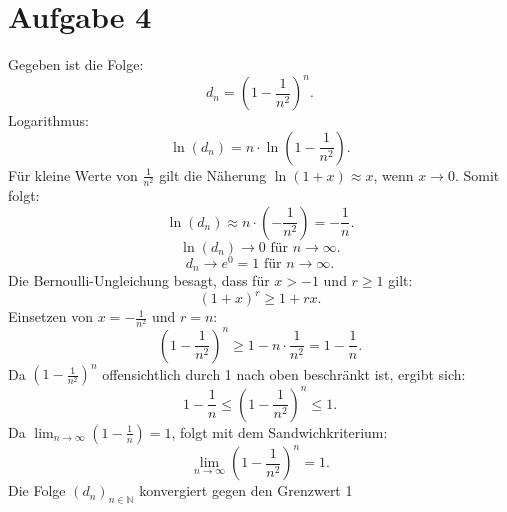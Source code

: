 \documentclass{article}
\begin{document}
\section{Aufgabe 4}
Gegeben ist die Folge:
\[d_n = \left(1 - \frac{1}{n^2}\right)^n.\]
Logarithmus:
\[\ln(d_n) = n \cdot \ln\left(1 - \frac{1}{n^2}\right).\]
Für kleine Werte von \(\frac{1}{n^2}\) gilt die Näherung \(\ln(1 + x) \approx x\), wenn \(x \to 0\). Somit folgt:
\[\ln(d_n) \approx n \cdot \left(-\frac{1}{n^2}\right) = -\frac{1}{n}.\]
\[\ln(d_n) \to 0 \text{ für } n \to \infty.\]
\[d_n \to e^0 = 1 \text{ für } n \to \infty.\]
Die Bernoulli-Ungleichung besagt, dass für \(x > -1\) und \(r \geq 1\) gilt:
\[(1 + x)^r \geq 1 + rx.\]
Einsetzen von \(x = -\frac{1}{n^2}\) und \(r = n\):
\[\left(1 - \frac{1}{n^2}\right)^n \geq 1 - n \cdot \frac{1}{n^2} = 1 - \frac{1}{n}.\]
Da \(\left(1 - \frac{1}{n^2}\right)^n\) offensichtlich durch 1 nach oben beschränkt ist, ergibt sich:
\[1 - \frac{1}{n} \leq \left(1 - \frac{1}{n^2}\right)^n \leq 1.\]
Da \(\lim_{n \to \infty} \left(1 - \frac{1}{n}\right) = 1\), folgt mit dem Sandwichkriterium:
\[\lim_{n \to \infty} \left(1 - \frac{1}{n^2}\right)^n = 1.\]
Die Folge \((d_n)_{n \in \mathbb{N}}\) konvergiert gegen den Grenzwert 1
\end{document}
